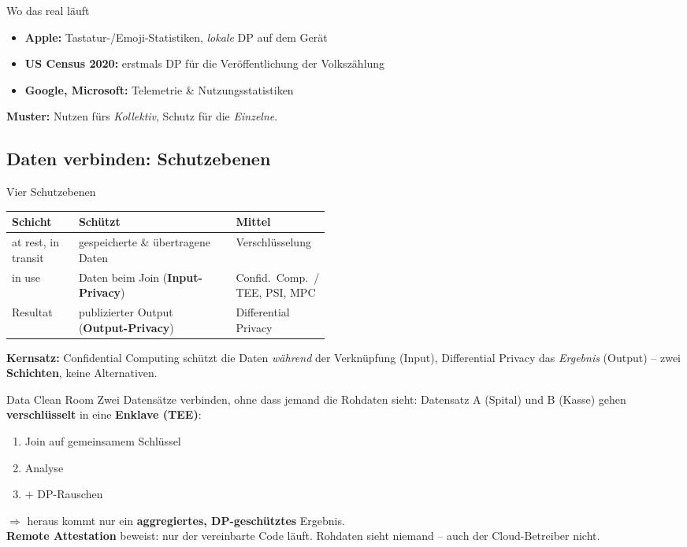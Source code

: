 \documentclass[a4paper, fontsize=7pt]{scrartcl}
\renewcommand*{\arraystretch}{1.5}  %
\begin{document}
\begin{subbox}{Wo das real läuft}
\begin{itemize}
    \item \textbf{Apple:} Tastatur-/Emoji-Statistiken, \emph{lokale} DP
          auf dem Gerät
    \item \textbf{US Census 2020:} erstmals DP für die Veröffentlichung
          der Volkszählung
    \item \textbf{Google, Microsoft:} Telemetrie \& Nutzungsstatistiken
\end{itemize}
\textbf{Muster:} Nutzen fürs \emph{Kollektiv}, Schutz für die
\emph{Einzelne}.
\end{subbox}

\subsection{Daten verbinden: Schutzebenen}

\begin{mainbox}{Vier Schutzebenen}
\renewcommand*{\arraystretch}{1.2}
\setlength{\tabcolsep}{3pt}
\begin{tabularx}{\linewidth}{@{}>{\raggedright\arraybackslash}p{0.21\linewidth}|>{\raggedright\arraybackslash}X|>{\raggedright\arraybackslash}p{0.26\linewidth}@{}}
\textbf{Schicht} & \textbf{Schützt} & \textbf{Mittel} \\
\hline
at rest, in transit & gespeicherte \& übertragene Daten &
  Verschlüs\-selung \\
in use & Daten beim Join (\textbf{Input-Privacy}) &
  Confid.\ Comp.\ / TEE, PSI, MPC \\
Resultat & publizierter Output (\textbf{Output-Privacy}) &
  Differen\-tial Privacy \\
\end{tabularx}
\textbf{Kernsatz:} Confidential Computing schützt die Daten
\emph{während} der Verknüpfung (Input), Differential Privacy das
\emph{Ergebnis} (Output) -- zwei \textbf{Schichten}, keine Alternativen.
\end{mainbox}

\begin{subbox}{Data Clean Room}
Zwei Datensätze verbinden, ohne dass jemand die Rohdaten sieht:
Datensatz A (Spital) und B (Kasse) gehen \textbf{verschlüsselt} in eine
\textbf{Enklave (TEE)}:
\begin{enumerate}
    \item Join auf gemeinsamem Schlüssel
    \item Analyse
    \item $+$ DP-Rauschen
\end{enumerate}
$\Rightarrow$ heraus kommt nur ein \textbf{aggregiertes, DP-geschütztes}
Ergebnis.\\
\textbf{Remote Attestation} beweist: nur der vereinbarte Code läuft.
Rohdaten sieht niemand -- auch der Cloud-Betreiber nicht.
\end{subbox}
\end{document}
